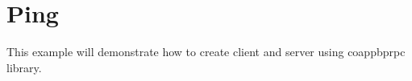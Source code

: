 \hypertarget{Ping_Ping}{}\section{Ping}\label{Ping_Ping}
This example will demonstrate how to create client and server using coappbprpc library. 